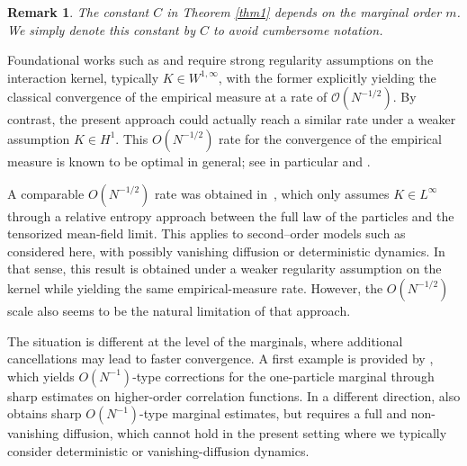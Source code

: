 \documentclass[pdflatex,sn-mathphys-num]{sn-jnl}
\theoremstyle{thmstyleone}%
\theoremstyle{thmstyletwo}%
\newtheorem{remark}{Remark}%
\theoremstyle{thmstylethree}%
\begin{document}
\begin{remark}
The constant \(C\) in Theorem \ref{thm1} depends on the marginal order \(m\). We simply denote this constant by \(C\) to avoid cumbersome notation.
\end{remark}
Foundational works such as \cite{dobrushin1979vlasov} and \cite{braun1977vlasov} require strong regularity assumptions on the interaction kernel, typically \(K\in W^{1,\infty}\), with the former explicitly yielding the classical convergence of the empirical measure at a rate of \(\mathcal{O}(N^{-1/2})\). By contrast, the present approach could actually reach a similar rate under a weaker assumption \(K\in H^{1}\). This \(O(N^{-1/2})\) rate for the convergence of the empirical measure is known to be optimal in general; see in particular \cite{bernou2025uniform} and \cite{wang2023gaussian}.

A comparable \(O(N^{-1/2})\) rate was obtained in~\cite{jabin2016mean}, which only assumes \(K\in L^{\infty}\) through a relative entropy approach between the full law of the particles and the tensorized mean-field limit. This applies to second--order models such as considered here, with possibly vanishing diffusion or deterministic dynamics. In that sense, this result is obtained under a weaker regularity assumption on the kernel while yielding the same empirical-measure rate. However, the \(O(N^{-1/2})\) scale also seems to be the natural limitation of that approach.

The situation is different at the level of the marginals, where additional cancellations may lead to faster convergence. A first example is provided by \cite{duerinckx2021size}, which yields \(O(N^{-1})\)-type corrections for the one-particle marginal through sharp estimates on higher-order correlation functions. 
In a different direction, \cite{lacker2023hierarchies} also obtains sharp \(O(N^{-1})\)-type marginal estimates, but requires a full and non-vanishing diffusion, which cannot hold in the present setting where we typically consider  deterministic or vanishing-diffusion dynamics.
\end{document}
